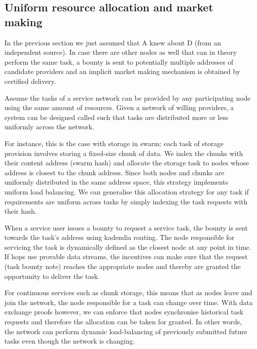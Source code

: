 \subsection{Uniform resource allocation and market making}

In the previous section we just assumed that A knew about D (from an independent source). In case there are other nodes as well that can in theory perform the same task, a bounty is sent to potentially multiple addresses of candidate providers and an implicit market making mechanism is obtained by certified delivery.

Assume the tasks of a service network can be provided by any participating node using the same amount of resources. Given a network of willing providers, a system can be designed called  such that tasks are distributed more or less uniformly across the network.

For instance, this is the case with storage in swarm: each task of storage provision involves storing a fixed-size chunk of data. We index the chunks with their content address (swarm hash) and allocate the storage task to nodes whose address is closest to the chunk address. Since both nodes and chunks are uniformly distributed in the same address space, this strategy implements uniform load balancing. We can generalise this allocation strategy for any task if requirements are uniform across tasks by simply indexing the task requests with their hash.

When a service user issues a bounty to request a service task, the bounty is sent towards the task's address using kademlia routing. The node responsible for servicing the task is dynamically defined as the closest node at any point in time. If hops use provable data streams, the incentives can make sure that the request (task bounty note) reaches the appropriate nodes and thereby are granted the opportunity to deliver the task.

For continuous services such as chunk storage, this means that as nodes leave and join the network, the node responsible for a task can change over time. With data exchange proofs however, we can enforce that nodes synchronise historical task requests and therefore the allocation can be taken for granted. In other words, the network can perform dynamic load-balancing of previously submitted future tasks even though the network is changing.

